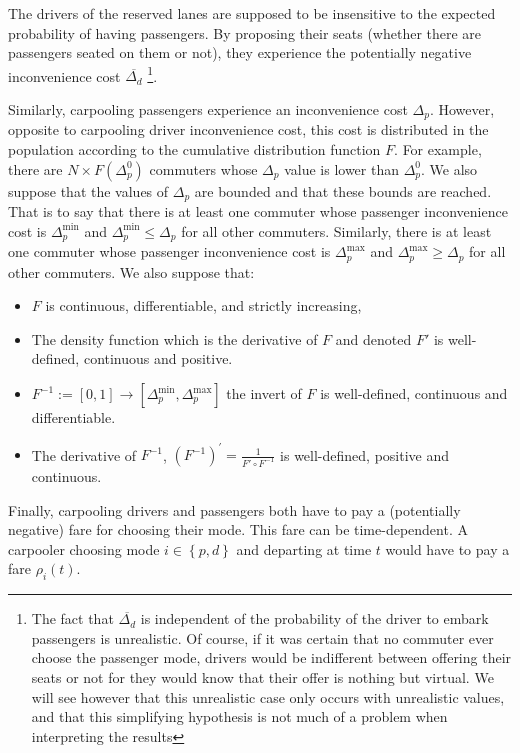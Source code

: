 \documentclass[english, a4paper]{article}
\theoremstyle{plain}
\theoremstyle{definition}
\theoremstyle{remark}
\begin{document}
The drivers of the reserved lanes are supposed to be insensitive to the expected probability of having passengers. By proposing their seats (whether there are passengers seated on them or not), they experience the potentially negative inconvenience cost $\overline{\Delta_d}$ \footnote{The fact that $\overline{\Delta_d}$ is independent of the probability of the driver to embark passengers is unrealistic. Of course, if it was certain that no commuter ever choose the passenger mode, drivers would be indifferent between offering their seats or not for they would know that their offer is nothing but virtual. We will see however that this unrealistic case only occurs with unrealistic values, and that this simplifying hypothesis is not much of a problem when interpreting the results}.

Similarly, carpooling passengers experience an inconvenience cost $\Delta _p$. However, opposite to carpooling driver inconvenience cost, this cost is distributed in the population according to the cumulative distribution function $F$. For example, there are $N \times F(\Delta _p ^0)$ commuters whose $\Delta _p$ value is lower than $\Delta _p ^0$. We also suppose that the values of $\Delta _p$ are bounded and that these bounds are reached. That is to say that there is at least one commuter whose passenger inconvenience cost is $\Delta _p ^{\text{min}}$ and $\Delta _p^{\text{min}} \leq \Delta _p$ for all other commuters. Similarly, there is at least one commuter whose passenger inconvenience cost is $\Delta _p ^{\text{max}}$ and $\Delta _p^{\text{max}} \geq \Delta _p$ for all other commuters. We also suppose that:
\begin{itemize}
    \item $F$ is continuous, differentiable, and strictly increasing,
    \item The density function which is the derivative of $F$ and denoted $F'$ is well-defined, continuous and positive.
    \item $F^{-1} := [0, 1] \longrightarrow [\Delta_p^{\text{min}}, \Delta_p^{\text{max}}]$ the invert of $F$ is well-defined, continuous and differentiable.
    \item The derivative of $F^{-1}$, $(F^{-1})^{'} = \frac{1}{F'\circ F^{-1}}$ is well-defined, positive and continuous.
\end{itemize}

Finally, carpooling drivers and passengers both have to pay a (potentially negative) fare for choosing their mode. This fare can be time-dependent. A carpooler choosing mode $i \in \left\{ p, d \right\}$ and departing at time $t$ would have to pay a fare $\rho _i (t)$.
\end{document}
